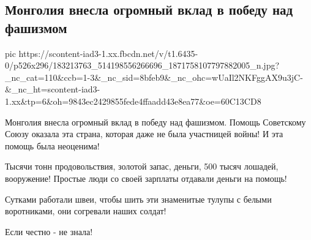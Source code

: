  
 
 
 
 
\subsection{Монголия внесла огромный вклад в победу над фашизмом}
\label{sec:08_05_2021.fb.serafimovich_tatiana.1.vov_mongolia_pobeda}

\ifcmt
  pic https://scontent-iad3-1.xx.fbcdn.net/v/t1.6435-0/p526x296/183213763_514198556266696_1871758107797882005_n.jpg?_nc_cat=110&ccb=1-3&_nc_sid=8bfeb9&_nc_ohc=wUaIl2NKFggAX9u3jC-&_nc_ht=scontent-iad3-1.xx&tp=6&oh=9843ec2429855fede4ffaadd43e8ea77&oe=60C13CD8
\fi

Монголия внесла огромный вклад в победу над фашизмом. Помощь Советскому Союзу
оказала эта страна, которая даже не была участницей войны! И эта помощь была
неоценима!

Тысячи тонн продовольствия, золотой запас, деньги, 500 тысяч  лошадей,
вооружение! Простые люди со своей зарплаты отдавали деньги на помощь!  

Сутками работали швеи, чтобы шить эти знаменитые тулупы с белыми воротниками, они согревали наших солдат!

Если честно - не знала!
